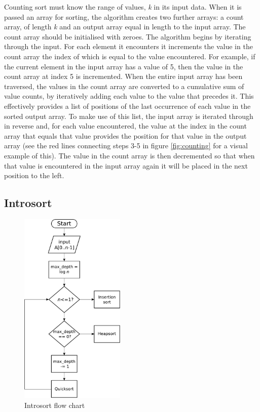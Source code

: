 \documentclass[12pt, a4paper]{article}
\begin{document}
Counting sort must know the range of values, \emph{k} in its input data. When it is passed an array for sorting, the algorithm creates two further arrays: a count array, of length \emph{k} and an output array equal in length to the input array. The count array should be initialised with zeroes. The algorithm begins by iterating through the input. For each element it encounters it increments the value in the count array the index of which is equal to the value encountered. For example, if the current element in the input array has a value of 5, then the value in the count array at index 5 is incremented. When the entire input array has been traversed, the values in the count array are converted to a cumulative sum of value counts, by iteratively adding each value to the value that precedes it. This effectively provides a list of positions of the last occurrence of each value in the sorted output array. To make use of this list, the input array is iterated through in reverse and, for each value encountered, the value at the index in the count array that equals that value provides the position for that value in the output array (see the red lines connecting steps 3-5 in figure \ref{fig:counting} for a visual example of this). The value in the count array is then decremented so that when that value is encountered in the input array again it will be placed in the next position to the left.


\newpage
\subsection{Introsort}\label{sec:introsort}

\begin{figure}
    \centering
    \includegraphics[width=5cm]{figures/introsort.pdf}
    \caption{\label{fig:introsort}Introsort flow chart}
\end{figure}
\end{document}
